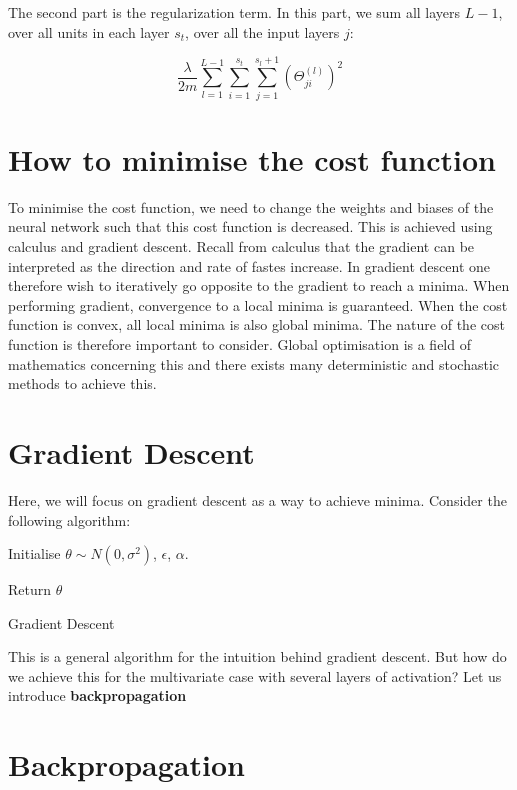 The second part is the regularization term. In this part, we sum all layers $L-1$, over all units in each layer $s_t$, over all the input layers $j$:

\[
    \frac{\lambda}{2m}\sum_{l=1}^{L-1}\sum_{i=1}^{s_t}\sum_{j=1}^{s_l+1}(\Theta_{ji}^{(l)})^2
\]

\section{How to minimise the cost function}

To minimise the cost function, we need to change the weights and biases of the 
neural network such that this cost function is decreased. This is achieved using
calculus and gradient descent. Recall from calculus that the gradient can be
interpreted as the direction and rate of fastes increase. In gradient descent
one therefore wish to iteratively go opposite to the gradient to reach a minima.
When performing gradient, convergence to a local minima is guaranteed. 
When the cost function is convex, all local minima is also global minima.
The nature of the cost function is therefore important to consider. 
Global optimisation is a field of mathematics concerning this and there exists 
many deterministic and stochastic methods to achieve this.

\section{Gradient Descent}
Here, we will focus on gradient descent as a way to achieve minima. Consider the
following algorithm:

\begin{algorithm}[H]
    \SetAlgoLined
    Initialise $\theta \sim N(0, \sigma^2)$, $\epsilon$, $\alpha$.


    Return $\theta$
    \caption{Gradient Descent}
\end{algorithm}

This is a general algorithm for the intuition behind gradient descent. But how 
do we achieve this for the multivariate case with several layers of activation?
Let us introduce \textbf{backpropagation}

\section{Backpropagation}

